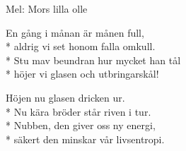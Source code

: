 \begin{SongText}
    \begin{SongInfo}
        Mel: Mors lilla olle
    \end{SongInfo}
    \begin{SongVerse}
        En gång i månan är månen full,\\*%
        aldrig vi set honom falla omkull.\\*%
        Stu mav beundran hur mycket han tål\\*%
        höjer vi glasen och utbringarskål!
    \end{SongVerse}
    \begin{SongVerse}
        Höjen nu glasen dricken ur.\\*%
        Nu kära bröder står riven i tur.\\*%
        Nubben, den giver oss ny energi,\\*%
        säkert den minskar vår livsentropi.
    \end{SongVerse}
\end{SongText}
